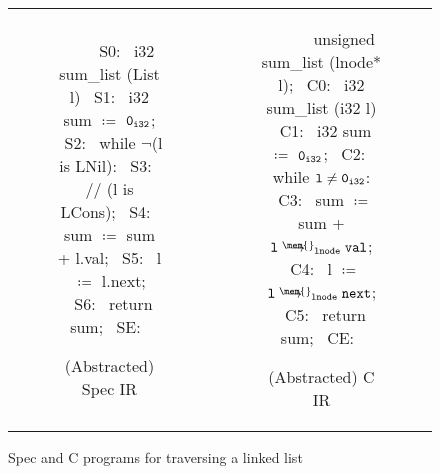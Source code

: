 \begin{figure}
\begin{tabular}{cc}
\begin{subfigure}[b]{0.45\textwidth}
\begin{center}
\begin{allLangEnvFoot}
~{\scriptsize \textcolor{mygray}{   }}~   
~{\scriptsize \textcolor{mygray}{S0:}}~ i32 sum_list (List l) {
~{\scriptsize \textcolor{mygray}{S1:}}~   i32 sum $\coloneqq$ ${\tt 0_{i32}}$;
~{\scriptsize \textcolor{mygray}{S2:}}~   while $\neg$(l is LNil):
~{\scriptsize \textcolor{mygray}{S3:}}~     // (l is LCons);
~{\scriptsize \textcolor{mygray}{S4:}}~     sum $\coloneqq$ sum + l.val;
~{\scriptsize \textcolor{mygray}{S5:}}~     l   $\coloneqq$ l.next;
~{\scriptsize \textcolor{mygray}{S6:}}~   return sum;
~{\scriptsize \textcolor{mygray}{SE:}}~ }
\end{allLangEnvFoot}
\end{center}
\caption{\label{fig:llTraverseSpec}(Abstracted) Spec IR}
\end{subfigure}%
&
\begin{subfigure}[b]{0.55\textwidth}
\begin{center}
\begin{allLangEnvFoot}
~{\scriptsize \textcolor{mygray}{\ \ \ }}~ unsigned sum_list (lnode* l);
~{\scriptsize \textcolor{mygray}{C0:}}~ i32 sum_list (i32 l) {
~{\scriptsize \textcolor{mygray}{C1:}}~   i32 sum $\coloneqq$ ${\tt 0_{i32}}$;
~{\scriptsize \textcolor{mygray}{C2:}}~   while ${\tt l \neq 0_{i32}}$:
~{\scriptsize \textcolor{mygray}{C3:}}~     sum $\coloneqq$ sum + $\structPointer{\tt l}{\mem{}}{lnode}{val}$;
~{\scriptsize \textcolor{mygray}{C4:}}~     l   $\coloneqq$ $\structPointer{\tt l}{\mem{}}{lnode}{next}$;
~{\scriptsize \textcolor{mygray}{C5:}}~   return sum;
~{\scriptsize \textcolor{mygray}{CE:}}~ }
\end{allLangEnvFoot}
\end{center}
\caption{\label{fig:llTraverseC}(Abstracted) C IR}
\end{subfigure}%
\\
\end{tabular}
\caption{\label{fig:llTraverseSpecIRAndCIR}Spec and C programs for traversing a linked list}
\end{figure}
